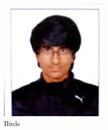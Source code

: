 \documentclass[letterpaper,11pt]{article}
\begin{document}
\begin{figure}
  \begin{center}
    \includegraphics[width=0.48\textwidth]{PHOTO}
  \end{center}
  \caption{Birds}

\end{figure}
\end{document}
